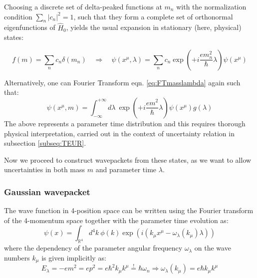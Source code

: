 \documentclass[a4paper,10pt]{article}
\newcommand\numberthis{\addtocounter{equation}{1}\tag{\theequation}} %
\numberwithin{equation}{section}
\begin{document}

Choosing a discrete set of delta-peaked functions at $m_n$ with the normalization condition $\sum_n |c_n|^2 = 1$, such that they form a complete set of orthonormal eigenfunctions of $\hat{H}_0$, yields the usual expansion in stationary (here, physical) states: 

\begin{equation}
    f(m) = \sum_n c_n \delta(m_n) \quad \Rightarrow \quad \psi (x^\mu, \lambda) = \sum_n c_n  \exp{\left( +i \dfrac{e m_n^2}{\hbar} \lambda\right)} \psi(x^\mu)
\end{equation}

Alternatively, one can Fourier Transform eqn. \ref{eq:FTmasslambda} again such that:
\begin{equation}
    \psi (x^\mu, m) = \int_{-\infty}^{+\infty}  d\lambda \   \exp{\left( +i \frac{e m^2}{\hbar} \lambda\right)} \psi(x^\mu) g(\lambda)
    \label{eq:FTmasslambdaInLambda}
\end{equation}
The above represents a parameter time distribution and this requires thorough physical interpretation, carried out in the context of uncertainty relation in subsection \ref{subseq:TEUR}.

Now we proceed to construct wavepackets from these states, as we want to allow uncertainties in both mass $m$ and parameter time $\lambda$.

\subsubsection{Gaussian wavepacket}
The wave function in 4-position space can be written using the Fourier transform of the 4-momentum space together with the parameter time evolution as:
\begin{equation}
    \psi(x) = \int_{\mathbb{R}^4} d^4k \ \phi(k)  \exp{\left(i (k_\mu x^\mu - \omega_\lambda (k_\mu) \lambda) \right)}
    \label{Fouriermomentumspace}
\end{equation}
where the dependency of the parameter angular frequency $\omega_\lambda$ on the wave numbers $k_\mu$ is given implicitly as:
\begin{equation}
    E_\lambda = - e m^2 = e p^2 = e \hbar^2 k_\mu k^\mu \stackrel{!}{=} \hbar \omega_n \Rightarrow \omega_\lambda (k_\mu) = e \hbar k_\mu k^\mu
\end{equation}
\end{document}
